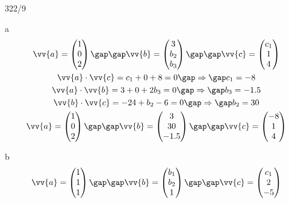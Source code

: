 \begin{exercise}{322/9}
  \item [a]
  \begin{gather*}
    \vv{a} = \begin{pmatrix}1 \\ 0 \\ 2\end{pmatrix} \gap\gap \vv{b} = \begin{pmatrix}3 \\ b_2 \\ b_3\end{pmatrix} \gap\gap \vv{c} = \begin{pmatrix}c_1 \\ 1 \\ 4\end{pmatrix} \\
    \vv{a} \cdot \vv{c} = c_1 + 0 + 8 = 0 \gap\Rightarrow\gap c_1 = -8 \\
    \vv{a} \cdot \vv{b} = 3 + 0 + 2b_3 = 0 \gap\Rightarrow\gap b_3 = -1.5 \\
    \vv{b} \cdot \vv{c} = -24 + b_2 - 6 = 0 \gap\Rightarrow\gap b_2 = 30 \\
    \vv{a} = \begin{pmatrix}1 \\ 0 \\ 2\end{pmatrix} \gap\gap \vv{b} = \begin{pmatrix}3 \\ 30 \\ -1.5\end{pmatrix} \gap\gap \vv{c} = \begin{pmatrix}-8 \\ 1 \\ 4\end{pmatrix}
  \end{gather*}
  \item [b]
  \begin{gather*}
    \vv{a} = \begin{pmatrix}1 \\ 1 \\ 1\end{pmatrix} \gap\gap \vv{b} = \begin{pmatrix}b_1 \\ b_2 \\ 1\end{pmatrix} \gap\gap \vv{c} = \begin{pmatrix}c_1 \\ 2 \\ -5\end{pmatrix} \\

\end{gather*}
\end{exercise}
